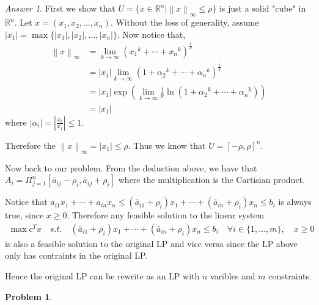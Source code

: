 \documentclass[10pt,a4paper]{article}
\theoremstyle{plain}
\theoremstyle{definition}
\newtheorem{problem}{Problem}
\theoremstyle{remark}
\newtheorem*{answer*}{Answer}
\newcommand{\IR}{\mathbb{R}}
\newcommand{\<}{\langle}
\renewcommand{\>}{\rangle}
\newcommand{\ra}{\rightarrow}                   %
\newcommand{\norm}[1]{\left\lVert#1\right\rVert}
\begin{document}
\begin{answer*} \hfill

First we show that $U = \{x\in \IR^n\vert \norm{x}_\infty \leq \rho\}$ is just a solid "cube" in $\IR^n$. Let $x = (x_1,x_2,...,x_n)$. Without the loss of generality, assume $|x_1| = \max\{|x_1|,|x_2|,...,|x_n|\}$. Now notice that,
\begin{align*}
\norm{x}_\infty &= \lim_{k\ra \infty} \left({x_1}^k+\cdots+{x_n}^k\right)^{\frac{1}{k}} \\
&= |x_1| \lim_{k\ra\infty} \left(1+{\alpha_2}^k+\cdots+{\alpha_n}^k\right)^\frac{1}{k} \\
&= |x_1| \exp(\lim_{k\ra\infty} \frac{1}{k} \ln \left(1+{\alpha_2}^k+\cdots+{\alpha_n}^k\right)) \\
&= |x_1|
\end{align*}
where $|\alpha_i| = |\frac{x_i}{x_1}| \leq 1$.

Therefore the $\norm{x}_\infty = |x_1| \leq \rho$. Thus we know that $U = [-\rho, \rho]^n$.

Now back to our problem. From the deduction above, we have that $A_i = \Pi_{j = 1}^n [\bar{a}_{ij}-\rho_i,\bar{a}_{ij}+\rho_i]$ where the multiplication is the Cartisian product.

Notice that $a_{i1}x_1 + \cdots + a_{in}x_n \leq (\bar{a}_{i1}+\rho_i)x_1 + \cdots + (\bar{a}_{in}+\rho_i)x_n \leq b_i$ is always true, since $x\geq 0$. Therefore any feasible solution to the linear system
\begin{align*}
\max c^T x \quad s.t. \quad (\bar{a}_{i1}+\rho_i)x_1 + \cdots + (\bar{a}_{in}+\rho_i)x_n \leq b_i \quad \forall i\in\{1,...,m\},\quad x\geq 0
\end{align*}
is also a feasible solution to the original LP and vice versa since the LP above only has contraints in the original LP.

Hence the original LP can be rewrite as an LP with $n$ varibles and $m$ constraints.
\end{answer*}


\begin{problem}
\end{problem}
\end{document}
